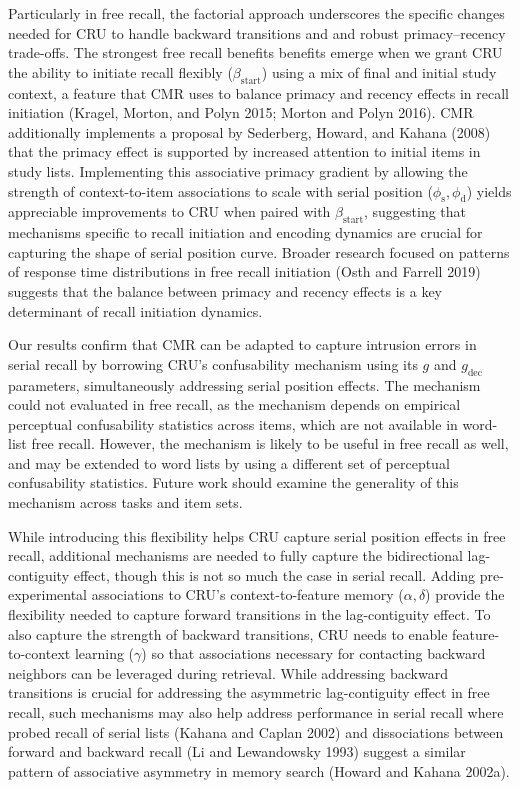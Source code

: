 \documentclass[
  letterpaper,
  11pt,
  english,
  singlespacing,
  headsepline]{MastersDoctoralThesis}
\begin{document}
Particularly in free recall, the factorial approach underscores the
specific changes needed for CRU to handle backward transitions and and
robust primacy--recency trade-offs. The strongest free recall benefits
benefits emerge when we grant CRU the ability to initiate recall
flexibly (\(\beta_\text{start}\)) using a mix of final and initial study
context, a feature that CMR uses to balance primacy and recency effects
in recall initiation (Kragel, Morton, and Polyn 2015; Morton and Polyn
2016). CMR additionally implements a proposal by Sederberg, Howard, and
Kahana (2008) that the primacy effect is supported by increased
attention to initial items in study lists. Implementing this associative
primacy gradient by allowing the strength of context-to-item
associations to scale with serial position
(\(\phi_\text{s}, \phi_\text{d}\)) yields appreciable improvements to
CRU when paired with \(\beta_\text{start}\), suggesting that mechanisms
specific to recall initiation and encoding dynamics are crucial for
capturing the shape of serial position curve. Broader research focused
on patterns of response time distributions in free recall initiation
(Osth and Farrell 2019) suggests that the balance between primacy and
recency effects is a key determinant of recall initiation dynamics.

Our results confirm that CMR can be adapted to capture intrusion errors
in serial recall by borrowing CRU's confusability mechanism using its
\(g\) and \(g_\text{dec}\) parameters, simultaneously addressing serial
position effects. The mechanism could not evaluated in free recall, as
the mechanism depends on empirical perceptual confusability statistics
across items, which are not available in word-list free recall. However,
the mechanism is likely to be useful in free recall as well, and may be
extended to word lists by using a different set of perceptual
confusability statistics. Future work should examine the generality of
this mechanism across tasks and item sets.

While introducing this flexibility helps CRU capture serial position
effects in free recall, additional mechanisms are needed to fully
capture the bidirectional lag-contiguity effect, though this is not so
much the case in serial recall. Adding pre-experimental associations to
CRU's context-to-feature memory (\(\alpha, \delta\)) provide the
flexibility needed to capture forward transitions in the lag-contiguity
effect. To also capture the strength of backward transitions, CRU needs
to enable feature-to-context learning (\(\gamma\)) so that associations
necessary for contacting backward neighbors can be leveraged during
retrieval. While addressing backward transitions is crucial for
addressing the asymmetric lag-contiguity effect in free recall, such
mechanisms may also help address performance in serial recall where
probed recall of serial lists (Kahana and Caplan 2002) and dissociations
between forward and backward recall (Li and Lewandowsky 1993) suggest a
similar pattern of associative asymmetry in memory search (Howard and
Kahana 2002a).
\end{document}
